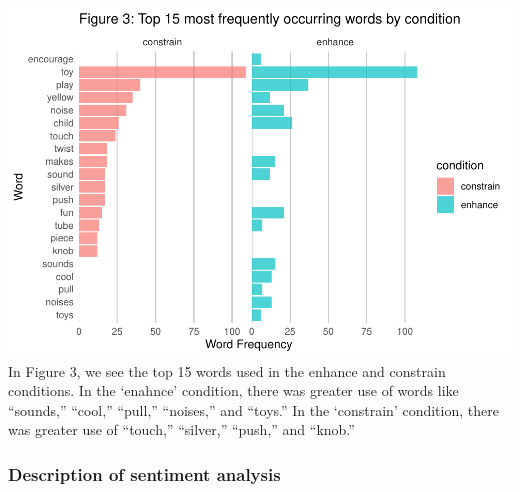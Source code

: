 \documentclass[
  english,
  man]{apa6}
\begin{document}
\includegraphics{capstone640_files/figure-latex/unnamed-chunk-1-1.pdf}
In Figure 3, we see the top 15 words used in the enhance and constrain
conditions. In the `enahnce' condition, there was greater use of words like ``sounds,'' ``cool,'' ``pull,'' ``noises,'' and ``toys.'' In the `constrain' condition, there was greater use of ``touch,'' ``silver,'' ``push,'' and ``knob.''

\hypertarget{description-of-sentiment-analysis}{%
\subsubsection{Description of sentiment analysis}\label{description-of-sentiment-analysis}}
\end{document}
